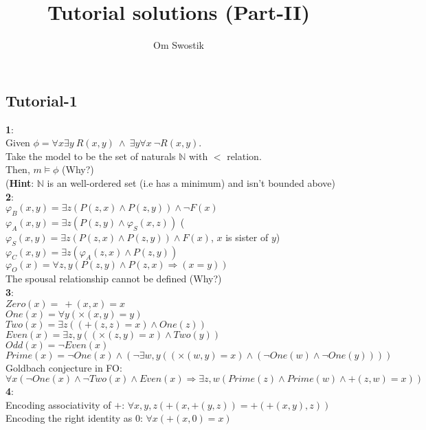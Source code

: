\documentclass{article}
\title{\textbf{Tutorial solutions (Part-II)}}
\author{Om Swostik}
\date{}
\begin{document}
\maketitle
\tableofcontents
\clearpage
\begin{flushleft}
\section{Tutorial-1}
\textbf{1}:\\
Given $\phi= \forall x\exists y \:R(x,y)\: \wedge\: \exists y \forall x\:\neg R(x,y)$.\\
Take the model to be the set of naturals $\mathbb{N}$ with $<$ relation.\\
Then, $m\models \phi$ (Why?)\\
(\textbf{Hint}: $\mathbb{N}$ is an well-ordered set (i.e has a minimum) and isn't bounded above)\\
\textbf{2}:\\
$\varphi_B(x,y)=\exists z(P(z,x)\wedge P(z,y))\wedge \neg F(x)$\\
$\varphi_A(x,y)=\exists z(P(z,y)\wedge \varphi_S(x,z))$   \hspace{4.5mm} ($\varphi_S(x,y)=\exists z(P(z,x)\wedge P(z,y))\wedge F(x)$, $x$ is sister of $y$)\\
$\varphi_C(x,y)=\exists z(\varphi_A(z,x)\wedge P(z,y))$\\
$\varphi_O(x)=\forall z,y (P(z,y)\wedge P(z,x)\Rightarrow (x=y))$\\
The spousal relationship cannot be defined (Why?)\\
\textbf{3}:\\
$Zero(x)=\:+(x,x)=x$\\
$One(x)= \forall y(\times(x,y)=y)$\\
$Two(x)= \exists z((+(z,z)=x)\wedge One(z))$\\
$Even(x)= \exists z,y((\times(z,y)=x)\wedge Two(y))$ \\
$Odd(x)=\neg Even(x)$\\
$Prime(x)= \neg One(x)\wedge (\neg \exists w,y((\times(w,y)=x)\wedge(\neg One(w)\wedge \neg One(y))))$\\
Goldbach conjecture in FO: $\forall x(\neg One(x)\wedge \neg Two(x)\wedge Even(x)\Rightarrow \exists z,w(Prime(z)\wedge Prime(w)\wedge +(z,w)=x))$\\
\textbf{4}:\\
Encoding associativity of $+$:  $\forall x,y,z(+(x,+(y,z))=+(+(x,y),z))$\\
Encoding the right identity as $0$:  $\forall x(+(x,0)=x)$\\

\end{flushleft}
\end{document}
